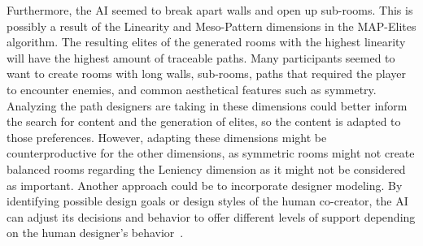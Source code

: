 
Furthermore, the AI seemed to break apart walls and open up sub-rooms. This is possibly a result of the Linearity and Meso-Pattern dimensions in the MAP-Elites algorithm. The resulting elites of the generated rooms with the highest linearity will have the highest amount of traceable paths. Many participants seemed to want to create rooms with long walls, sub-rooms, paths that required the player to encounter enemies, and common aesthetical features such as symmetry. Analyzing the path designers are taking in these dimensions could better inform the search for content and the generation of elites, so the content is adapted to those preferences. However, adapting these dimensions might be counterproductive for the other dimensions, as symmetric rooms might not create balanced rooms regarding the Leniency dimension as it might not be considered as important. Another approach could be to incorporate designer modeling. By identifying possible design goals or design styles of the human co-creator, the AI can adjust its decisions and behavior to offer different levels of support depending on the human designer's behavior~. 




